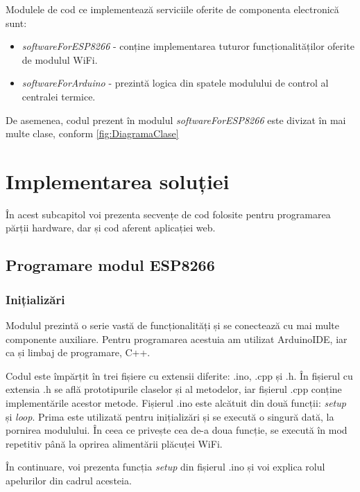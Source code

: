 	Modulele de cod ce implementează serviciile oferite de componenta electronică sunt:
	\begin{itemize}
		\setlength{\itemindent}{2em}
			\itemsep0em
			\item \textit{softwareForESP8266} - conține implementarea tuturor funcționalităților oferite de modulul WiFi.
			\item \textit{softwareForArduino} - prezintă logica din spatele modulului de control al centralei termice.
	\end{itemize}

	De asemenea, codul prezent în modulul \textit{softwareForESP8266} este divizat în mai multe clase, conform \ref{fig:DiagramaClase}

\section{Implementarea soluției}

	În acest subcapitol voi prezenta secvențe de cod folosite pentru programarea părții hardware, dar și cod aferent aplicației web.

\subsection{Programare modul ESP8266}

\subsubsection{Inițializări}

	Modulul prezintă o serie vastă de funcționalități și se conectează cu mai multe componente auxiliare. Pentru programarea acestuia am utilizat ArduinoIDE, iar ca și limbaj de programare, C++. 

	Codul este împărțit în trei fișiere cu extensii diferite: .ino, .cpp și .h. În fișierul cu extensia .h se află prototipurile claselor și al metodelor, iar fișierul .cpp conține implementările acestor metode. Fișierul .ino este alcătuit din două funcții: \textit{setup} și \textit{loop}. Prima este utilizată pentru inițializări și se execută o singură dată, la pornirea modulului. În ceea ce privește cea de-a doua funcție, se execută în mod repetitiv până la oprirea alimentării plăcuței WiFi.

\vspace{1em}

	În continuare, voi prezenta funcția \textit{setup} din fișierul .ino și voi explica rolul apelurilor din cadrul acesteia.




